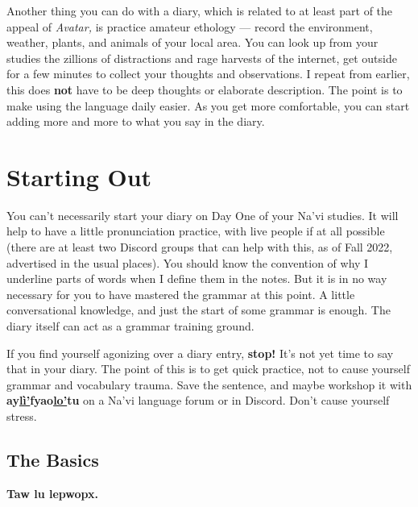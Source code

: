 \documentclass[nofonts]{tufte-handout}
\newcommand{\N}[1]{\textbf{\textcolor{navi}{#1}}}
\begin{document}
Another thing you can do with a diary, which is related to at least
part of the appeal of \textit{Avatar,} is practice amateur ethology —
record the environment, weather, plants, and animals of your local
area.  You can look up from your studies the zillions of distractions
and rage harvests of the internet, get outside for a few minutes to
collect your thoughts and observations.  
I repeat from earlier, this does \textbf{not} have to be deep thoughts
or elaborate description.  The point is to make using the language
daily easier.  As you get more comfortable, you can start adding more
and more to what you say in the diary.


\section*{Starting Out}

You can't necessarily start your diary on Day One of your Na'vi
studies.  It will help to have a little pronunciation practice, with
live people if at all possible (there are at least two Discord groups
that can help with this, as of Fall 2022, advertised in the usual
places).  You should know the
convention of why I underline parts of words when I define them in the
notes.  But it is in no way necessary for you to have mastered the
grammar at this point.   A little
conversational knowledge, and just the start of some grammar is
enough.  The diary itself can act as a grammar training ground.

If you find yourself agonizing over a diary entry, \textbf{stop!}
It's not yet time to say that in your diary.  The point of this is to
get quick practice, not to cause yourself grammar and vocabulary
trauma.  Save the sentence, and maybe workshop it with
\N{ay\uline{lì'}fyao\uline{lo'}tu} on a Na'vi language forum or in
Discord.  Don't cause yourself stress.

\subsection*{The Basics}
\N{Taw lu lepwopx.}\marginnote{\N{taw}: ``sky;'' \N{lu}: ``be;''
  \N{lep\uline{wopx}}: ``cloudy.''  \textit{It's cloudy.}}
\end{document}
